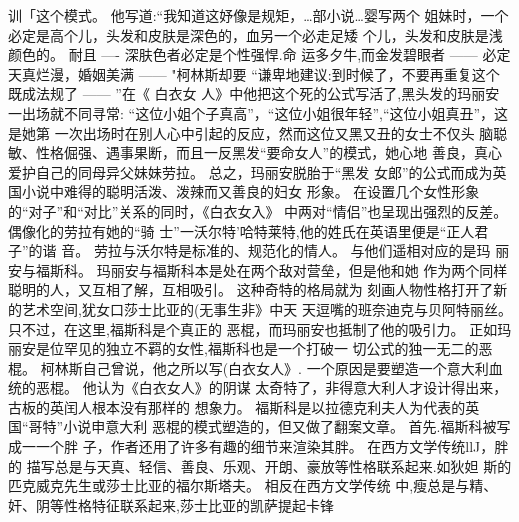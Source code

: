 \documentclass[a4paper]{article}
\begin{document}
训「这个模式。 他写道:“我知道这妤像是规矩，…部小说…婴写两个
姐妹时，一个必定是高个儿，头发和皮肤是深色的，血另一个必走足矮
个儿，头发和皮肤是浅颜色的。 耐且 ---- 深肤色者必定是个性强悍.命
运多夕牛,而金发碧眼者 ------ 必定天真烂漫，婚姻美满 ------ "柯林斯却要
“谦卑地建议:到时候了，不要再重复这个既成法规了 ------ ”在《 白衣女
人》中他把这个死的公式写活了,黑头发的玛丽安一出场就不同寻常:
“这位小姐个子真高”，“这位小姐很年轻”,“这位小姐真丑”，这是她第
一次出场时在别人心中引起的反应，然而这位又黑又丑的女士不仅头
脑聪敏、性格倔强、遇事果断，而且一反黑发“要命女人”的模式，她心地
善良，真心爱护自己的同母异父妹妹劳拉。 总之，玛丽安脱胎于“黑发
女郎”的公式而成为英国小说中难得的聪明活泼、泼辣而又善良的妇女
形象。
在设置几个女性形象的“对子”和“对比”关系的同时，《白衣女入》
中两对“情侣”也呈现出强烈的反差。 偶像化的劳拉有她的“骑
士”一沃尔特'哈特莱特,他的姓氏在英语里便是“正人君子”的谐
音。 劳拉与沃尔特是标准的、规范化的情人。 与他们遥相对应的是玛
丽安与福斯科。 玛丽安与福斯科本是处在两个敌对营垒，但是他和她
作为两个同样聪明的人，又互相了解，互相吸引。 这种奇特的格局就为
刻画人物性格打开了新的艺术空间,犹女口莎士比亚的(无事生非》中天
天逗嘴的班奈迪克与贝阿特丽丝。 只不过，在这里,福斯科是个真正的
恶棍，而玛丽安也抵制了他的吸引力。
正如玛丽安是位罕见的独立不羁的女性,福斯科也是一个打破一
切公式的独一无二的恶棍。 柯林斯自己曾说，他之所以写(白衣女人》.
一个原因是要塑造一个意大利血统的恶棍。 他认为《白衣女人》的阴谋
太奇特了，非得意大利人才设计得出来，古板的英闰人根本没有那样的
想象力。 福斯科是以拉德克利夫人为代表的英国“哥特”小说申意大利
恶棍的模式塑造的，但又做了翻案文章。 首先.福斯科被写成一一个胖
子，作者还用了许多有趣的细节来渲染其胖。 在西方文学传统llJ，胖的
描写总是与天真、轻信、善良、乐观、开朗、豪放等性格联系起来.如狄妲
斯的匹克威克先生或莎士比亚的福尔斯塔夫。 相反在西方文学传统
中,瘦总是与精、奸、阴等性格特征联系起来,莎士比亚的凯萨提起卡锋
\end{document}
